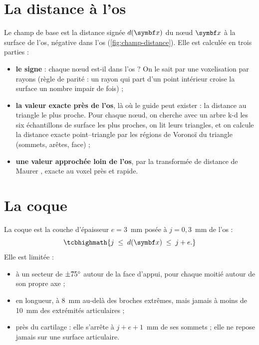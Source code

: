\section{La distance à l'os}
\label{sec:distance}

Le champ de base est la distance signée $d(\vb{x})$ du nœud $\vb{x}$ à la surface de l'os, négative dans l'os
(\cref{fig:champ-distance}). Elle est calculée en trois parties :
\begin{itemize}
  \item \textbf{le signe} : chaque nœud est-il dans l'os ? On le sait par une voxelisation par rayons (règle de
  parité : un rayon qui part d'un point intérieur croise la surface un nombre impair de fois) ;
  \item \textbf{la valeur exacte près de l'os}, là où le guide peut exister : la distance au triangle le plus proche.
  Pour chaque nœud, on cherche avec un arbre k-d les six échantillons de surface les plus proches, on lit leurs
  triangles, et on calcule la distance exacte point--triangle par les régions de Voronoï du triangle (sommets, arêtes,
  face) \cite{ericson2005} ;
  \item \textbf{une valeur approchée loin de l'os}, par la transformée de distance de Maurer \cite{maurer2003}, exacte au
  voxel près et rapide.
\end{itemize}


\section{La coque}

La coque est la couche d'épaisseur $e = 3$~mm posée à $j = 0{,}3$~mm de l'os :
\begin{equation}
  \tcbhighmath{j \;\leq\; d(\vb{x}) \;\leq\; j + e.}
\end{equation}
Elle est limitée :
\begin{itemize}
  \item à un secteur de $\pm 75^\circ$ autour de la face d'appui, pour chaque moitié autour de son propre axe ;
  \item en longueur, à 8~mm au-delà des broches extrêmes, mais jamais à moins de 10~mm des extrémités articulaires ;
  \item près du cartilage : elle s'arrête à $j + e + 1$~mm de ses sommets ; elle ne repose jamais sur une surface
  articulaire.
\end{itemize}


